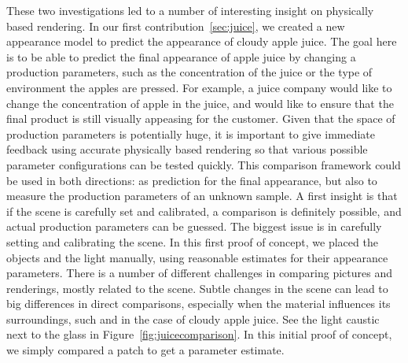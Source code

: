 These two investigations led to a number of interesting insight on physically based rendering. In our first contribution~\ref{sec:juice}, we created a new appearance model to predict the appearance of cloudy apple juice. The goal here is to be able to predict the final appearance of apple juice by changing a production parameters, such as the concentration of the juice or the type of environment the apples are pressed. For example, a juice company would like to change the concentration of apple in the juice, and would like to ensure that the final product is still visually appeasing for the customer. Given that the space of production parameters is potentially huge, it is important to give immediate feedback using accurate physically based rendering so that various possible parameter configurations can be tested quickly. This comparison framework could be used in both directions: as prediction for the final appearance, but also to measure the production parameters of an unknown sample. A first insight is that if the scene is carefully set and calibrated, a comparison is definitely possible, and actual production parameters can be guessed. The biggest issue is in carefully setting and calibrating the scene. In this first proof of concept, we placed the objects and the light manually, using reasonable estimates for their appearance parameters. There is a number of different challenges in comparing pictures and renderings, mostly related to the scene. Subtle changes in the scene can lead to big differences in direct comparisons, especially when the material influences its surroundings, such and in the case of cloudy apple juice. See the light caustic next to the glass in Figure~\ref{fig:juicecomparison}. In this initial proof of concept, we simply compared a patch to get a parameter estimate.

